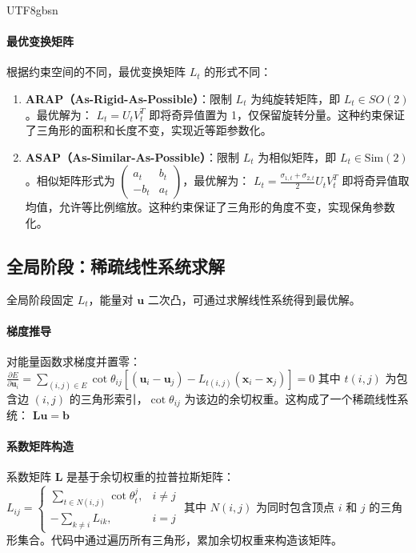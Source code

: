 \documentclass[10pt,a4paper,twocolumn]{article}
\begin{document}
\begin{CJK*}{UTF8}{gbsn}
\paragraph{最优变换矩阵}
根据约束空间的不同，最优变换矩阵 $L_t$ 的形式不同：
\begin{enumerate}
\item \textbf{ARAP（As-Rigid-As-Possible）}：限制 $L_t$ 为纯旋转矩阵，即 $L_t \in SO(2)$。最优解为：
$
L_t = U_t V_t^T
$
即将奇异值置为 1，仅保留旋转分量。这种约束保证了三角形的面积和长度不变，实现近等距参数化。

\item \textbf{ASAP（As-Similar-As-Possible）}：限制 $L_t$ 为相似矩阵，即 $L_t \in \text{Sim}(2)$。相似矩阵形式为 $\begin{pmatrix}a_t & b_t \\ -b_t & a_t\end{pmatrix}$，最优解为：
$
L_t = \frac{\sigma_{1,t} + \sigma_{2,t}}{2} U_t V_t^T
$
即将奇异值取均值，允许等比例缩放。这种约束保证了三角形的角度不变，实现保角参数化。
\end{enumerate}

\subsection{全局阶段：稀疏线性系统求解}
全局阶段固定 $L_t$，能量对 $\mathbf{u}$ 二次凸，可通过求解线性系统得到最优解。

\paragraph{梯度推导}
对能量函数求梯度并置零：
$
\frac{\partial E}{\partial \mathbf{u}_i} = \sum_{(i,j)\in E} \cot\theta_{ij} \left[ (\mathbf{u}_i - \mathbf{u}_j) - L_{t(i,j)}(\mathbf{x}_i - \mathbf{x}_j) \right] = 0
$
其中 $t(i,j)$ 为包含边 $(i,j)$ 的三角形索引，$\cot\theta_{ij}$ 为该边的余切权重。这构成了一个稀疏线性系统：
$
\mathbf{L} \mathbf{u} = \mathbf{b}
$

\paragraph{系数矩阵构造}
系数矩阵 $\mathbf{L}$ 是基于余切权重的拉普拉斯矩阵：
$
L_{ij} = \begin{cases}
\sum_{t\in N(i,j)} \cot\theta_t^j, & i \neq j \\
-\sum_{k\neq i} L_{ik}, & i = j
\end{cases}
$
其中 $N(i,j)$ 为同时包含顶点 $i$ 和 $j$ 的三角形集合。代码中通过遍历所有三角形，累加余切权重来构造该矩阵。


\end{CJK*}
\end{document}
